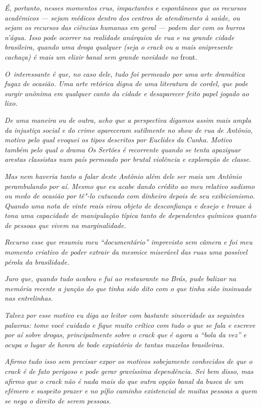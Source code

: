 \emph{É, portanto, nesses momentos crus, impactantes e espontâneos que
os recursos acadêmicos --- sejam médicos dentro dos centros de
atendimento à saúde, ou sejam os recursos das ciências humanas em geral
--- podem dar com os burros n'água. Isso pode ocorrer na realidade
anárquica de rua e na grande cidade brasileira, quando uma droga
qualquer (seja o crack ou a mais onipresente cachaça) é mais um elixir
banal sem grande novidade no} front.~

\emph{O~interessante é que, no caso dele, tudo foi permeado por uma arte
dramática fugaz de ocasião. Uma arte retórica digna de uma literatura de
cordel, que pode surgir anônima em qualquer canto da cidade e
desaparecer feito papel jogado ao lixo.}~

\emph{De uma maneira ou de outra, acho que a perspectiva digamos assim
mais ampla da injustiça social e do crime apareceram sutilmente no show
de rua de Antônio, motivo pelo qual evoquei os tipos descritos por
Euclides da Cunha. Motivo também pelo qual o drama Os Sertões é
recorrente quando se tenta apaziguar arestas classistas num país
permeado por brutal violência e exploração de classe.}~

\emph{Mas nem haveria tanto a falar deste Antônio além dele ser mais um
Antônio perambulando por aí. Mesmo que eu acabe dando crédito ao meu
relativo sadismo ou medo de ocasião por tê"-lo cutucado com dinheiro
depois de seu exibicionismo. Quando uma nota de vinte reais virou objeto
de desconfiança e desejo e trouxe à tona uma capacidade de manipulação
típica tanto de dependentes químicos quanto de pessoas que vivem na
marginalidade.}~

\emph{Recurso esse que resumiu meu ``documentário'' imprevisto sem
câmera e foi meu momento criativo de poder extrair da mesmice miserável
das ruas uma possível pérola da brasilidade.}~

\emph{Juro que, quando tudo acabou e fui ao restaurante no Brás, pude
balizar na memória recente a junção do que tinha sido dito com o que
tinha sido insinuado nas entrelinhas.}~

\emph{Talvez por esse motivo eu diga ao leitor com bastante sinceridade
as seguintes palavras: tome você cuidado e fique muito crítico com tudo
o que se fala e escreve por aí sobre drogas, principalmente sobre o
crack que é agora a ``bola da vez'' e ocupa o lugar de honra de bode
expiatório de tantas mazelas brasileiras.}~

\emph{Afirmo tudo isso sem precisar expor os motivos sobejamente
conhecidos de que o crack é de fato perigoso e pode gerar gravíssima
dependência. Sei bem disso, mas afirmo que o crack não é nada mais do
que outra opção banal da busca de um efêmero e suspeito prazer e no
pífio caminho existencial de muitas pessoas a quem se nega o direito de
serem pessoas.}~

